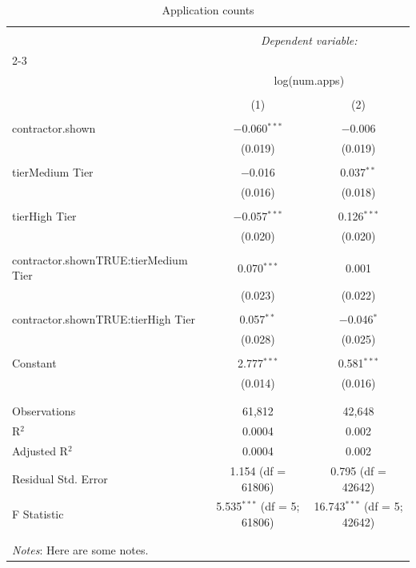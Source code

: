 
\begin{table}[!htbp] \centering 
  \caption{Application counts} 
  \label{} 
\begin{tabular}{@{\extracolsep{5pt}}lcc} 
\\[-1.8ex]\hline 
\hline \\[-1.8ex] 
 & \multicolumn{2}{c}{\textit{Dependent variable:}} \\ 
\cline{2-3} 
\\[-1.8ex] & \multicolumn{2}{c}{log(num.apps)} \\ 
\\[-1.8ex] & (1) & (2)\\ 
\hline \\[-1.8ex] 
 contractor.shown & $-$0.060$^{***}$ & $-$0.006 \\ 
  & (0.019) & (0.019) \\ 
  & & \\ 
 tierMedium Tier & $-$0.016 & 0.037$^{**}$ \\ 
  & (0.016) & (0.018) \\ 
  & & \\ 
 tierHigh Tier & $-$0.057$^{***}$ & 0.126$^{***}$ \\ 
  & (0.020) & (0.020) \\ 
  & & \\ 
 contractor.shownTRUE:tierMedium Tier & 0.070$^{***}$ & 0.001 \\ 
  & (0.023) & (0.022) \\ 
  & & \\ 
 contractor.shownTRUE:tierHigh Tier & 0.057$^{**}$ & $-$0.046$^{*}$ \\ 
  & (0.028) & (0.025) \\ 
  & & \\ 
 Constant & 2.777$^{***}$ & 0.581$^{***}$ \\ 
  & (0.014) & (0.016) \\ 
  & & \\ 
\hline \\[-1.8ex] 
Observations & 61,812 & 42,648 \\ 
R$^{2}$ & 0.0004 & 0.002 \\ 
Adjusted R$^{2}$ & 0.0004 & 0.002 \\ 
Residual Std. Error & 1.154 (df = 61806) & 0.795 (df = 42642) \\ 
F Statistic & 5.535$^{***}$ (df = 5; 61806) & 16.743$^{***}$ (df = 5; 42642) \\ 
\hline 
\hline \\[-1.8ex] 
\\
\emph{Notes}: Here are some notes.
\end{tabular}
\end{table}

